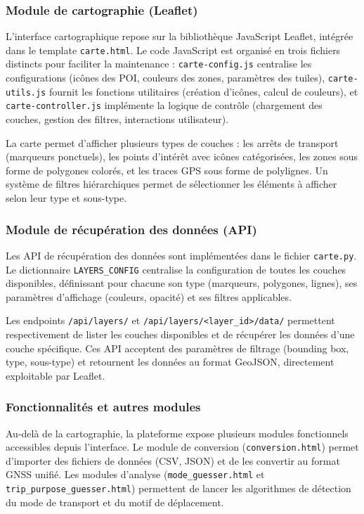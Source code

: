 \documentclass[french]{tai_info} %
\begin{document}
\subsubsection{Module de cartographie (Leaflet)}

L'interface cartographique repose sur la bibliothèque JavaScript Leaflet, intégrée dans le template \texttt{carte.html}. Le code JavaScript est organisé en trois fichiers distincts pour faciliter la maintenance : \texttt{carte-config.js} centralise les configurations (icônes des POI, couleurs des zones, paramètres des tuiles), \texttt{carte-utils.js} fournit les fonctions utilitaires (création d'icônes, calcul de couleurs), et \texttt{carte-controller.js} implémente la logique de contrôle (chargement des couches, gestion des filtres, interactions utilisateur).

La carte permet d'afficher plusieurs types de couches : les arrêts de transport (marqueurs ponctuels), les points d'intérêt avec icônes catégorisées, les zones sous forme de polygones colorés, et les traces GPS sous forme de polylignes. Un système de filtres hiérarchiques permet de sélectionner les éléments à afficher selon leur type et sous-type.

\subsubsection{Module de récupération des données (API)}

Les API de récupération des données sont implémentées dans le fichier \texttt{carte.py}. Le dictionnaire \texttt{LAYERS\_CONFIG} centralise la configuration de toutes les couches disponibles, définissant pour chacune son type (marqueurs, polygones, lignes), ses paramètres d'affichage (couleurs, opacité) et ses filtres applicables.

Les endpoints \texttt{/api/layers/} et \texttt{/api/layers/<layer\_id>/data/} permettent respectivement de lister les couches disponibles et de récupérer les données d'une couche spécifique. Ces API acceptent des paramètres de filtrage (bounding box, type, sous-type) et retournent les données au format GeoJSON, directement exploitable par Leaflet.

\subsubsection{Fonctionnalités et autres modules}

Au-delà de la cartographie, la plateforme expose plusieurs modules fonctionnels accessibles depuis l'interface. Le module de conversion (\texttt{conversion.html}) permet d'importer des fichiers de données (CSV, JSON) et de les convertir au format GNSS unifié. Les modules d'analyse (\texttt{mode\_guesser.html} et \texttt{trip\_purpose\_guesser.html}) permettent de lancer les algorithmes de détection du mode de transport et du motif de déplacement.
\end{document}
